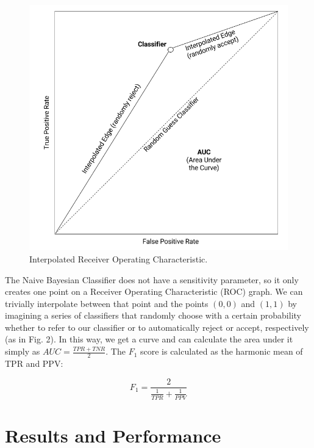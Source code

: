 \documentclass[format=acmlarge]{acmart}
\begin{document}
\begin{figure}
  \includegraphics{interpolated-roc}
  \caption{Interpolated Receiver Operating Characteristic.}
  \label{fig:two}
\end{figure}

The Naive Bayesian Classifier does not have a sensitivity parameter, so it only creates one point on a Receiver Operating Characteristic (ROC) graph.  We can trivially interpolate between that point and the points $(0, 0)$ and $(1, 1)$ by imagining a series of classifiers that randomly choose with a certain probability whether to refer to our classifier or to automatically reject or accept, respectively (as in Fig. 2). In this way, we get a curve and can calculate the area under it simply as $\mathit{AUC} = \frac{\mathit{TPR} + \mathit{TNR}}{2}$.  The $F_1$ score is calculated as the harmonic mean of TPR and PPV:

$$F_1 = \frac{2}{\frac{1}{\mathit{TPR}} + \frac{1}{\mathit{PPV}}}$$

\section{Results and Performance}
\end{document}
